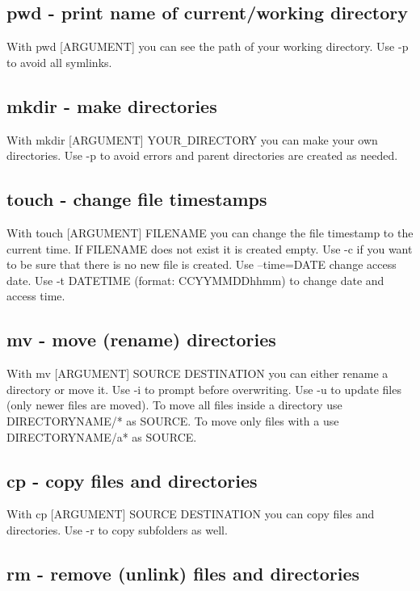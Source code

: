 \documentclass[10pt,a4paper]{scrartcl}
\begin{document}
\subsection{pwd - print name of current/working directory}

With pwd [ARGUMENT] you can see the path of your working directory. Use -p to avoid all symlinks.

\subsection{mkdir - make directories}

With mkdir [ARGUMENT] YOUR\verb$_$DIRECTORY you can make your own directories. Use -p to avoid errors and parent directories are created as needed.

\subsection{touch - change file timestamps}

With touch [ARGUMENT] FILENAME you can change the file timestamp to the current time. If FILENAME does not exist it is created empty. Use -c if you want to be sure that there is no new file is created. Use --time=DATE change access date. Use -t DATETIME (format: CCYYMMDDhhmm) to change date and access time.

\subsection{mv - move (rename) directories}

With mv [ARGUMENT] SOURCE DESTINATION you can either rename a directory or move it. Use -i to prompt before overwriting. Use -u to update files (only newer files are moved). To move all files inside a directory use DIRECTORYNAME/* as SOURCE. To move only files with a use DIRECTORYNAME/a* as SOURCE.

\subsection{cp - copy files and directories}

With cp [ARGUMENT] SOURCE DESTINATION you can copy files and directories. Use -r to copy subfolders as well.

\subsection{rm - remove (unlink) files and directories}
\end{document}

